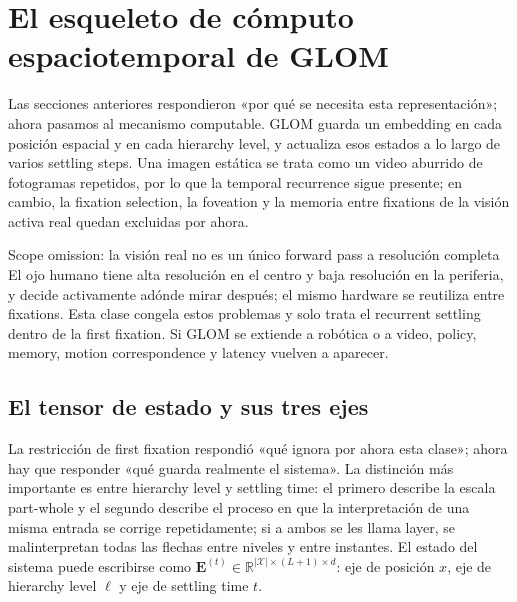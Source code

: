 \section{El esqueleto de cómputo espaciotemporal de GLOM}

Las secciones anteriores respondieron «por qué se necesita esta representación»; ahora pasamos al mecanismo computable. GLOM guarda un embedding en cada posición espacial y en cada hierarchy level, y actualiza esos estados a lo largo de varios settling steps. Una imagen estática se trata como un video aburrido de fotogramas repetidos, por lo que la temporal recurrence sigue presente; en cambio, la fixation selection, la foveation y la memoria entre fixations de la visión activa real quedan excluidas por ahora.


\begin{warningbox}{Scope omission: la visión real no es un único forward pass a resolución completa}
El ojo humano tiene alta resolución en el centro y baja resolución en la periferia, y decide activamente adónde mirar después; el mismo hardware se reutiliza entre fixations. Esta clase congela estos problemas y solo trata el recurrent settling dentro de la first fixation. Si GLOM se extiende a robótica o a video, policy, memory, motion correspondence y latency vuelven a aparecer.
\end{warningbox}

\subsection{El tensor de estado y sus tres ejes}

La restricción de first fixation respondió «qué ignora por ahora esta clase»; ahora hay que responder «qué guarda realmente el sistema». La distinción más importante es entre hierarchy level y settling time: el primero describe la escala part-whole y el segundo describe el proceso en que la interpretación de una misma entrada se corrige repetidamente; si a ambos se les llama layer, se malinterpretan todas las flechas entre niveles y entre instantes. El estado del sistema puede escribirse como $\mathbf E^{(t)}\in\mathbb R^{|\mathcal X|\times(L+1)\times d}$: eje de posición $x$, eje de hierarchy level $\ell$ y eje de settling time $t$.

